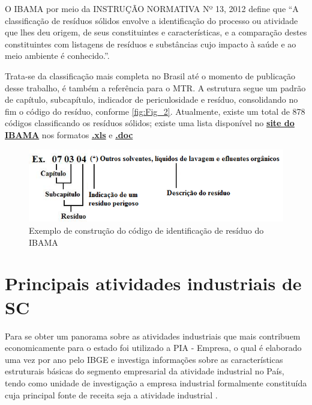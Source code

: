 O \gls{IBAMA} por meio da INSTRUÇÃO NORMATIVA Nº 13, 2012 \cite{noauthor_instrucao_ibama} define que “A classificação de resíduos sólidos envolve a identificação do processo ou atividade que lhes deu origem, de seus constituintes e características, e a comparação destes constituintes com listagens de resíduos e substâncias cujo impacto à saúde e ao meio ambiente é conhecido.”.

Trata-se da classificação mais completa no Brasil até o momento de publicação desse trabalho, é também a referência para o \gls{MTR}. A estrutura segue um padrão de capítulo, subcapítulo, indicador de periculosidade e resíduo, consolidando no fim o código do resíduo, conforme \autoref{fig:Fig_2}. Atualmente, existe um total de 878 códigos classificando os resíduos sólidos; existe uma lista disponível no \href{https://www.gov.br/ibama/pt-br/assuntos/emissoes-e-residuos/residuos/arquivos?b_start:int=0}{\textbf{site do IBAMA}} nos formatos \href{https://www.gov.br/ibama/pt-br/assuntos/emissoes-e-residuos/residuos/arquivos/ibama-lista-brasileira-de-residuos-solidos.xls/view}{\textbf{.xls}} e \href{https://www.gov.br/ibama/pt-br/assuntos/emissoes-e-residuos/residuos/arquivos/ibama-lista-brasileira-de-residuos-solidos.doc/view}{\textbf{.doc}}

\begin{figure}[h]
	\caption{\label{fig:Fig_2} Exemplo de construção do código de identificação de resíduo do IBAMA}
	\begin{center}
		\includegraphics[scale=0.8]{images/exemplo-codigo-ibama.png}
	\end{center}
\end{figure}


\section{Principais atividades industriais de SC}

Para se obter um panorama sobre as atividades industriais que mais contribuem economicamente para o estado foi utilizado a \gls{PIA} - Empresa, o qual é elaborado uma vez por ano pelo \gls{IBGE} e investiga informações sobre as características estruturais básicas do segmento empresarial da atividade industrial no País, tendo como unidade de investigação a empresa industrial formalmente constituída cuja principal fonte de receita seja a atividade industrial \cite{ibge_pia-empresa_2021}. 

